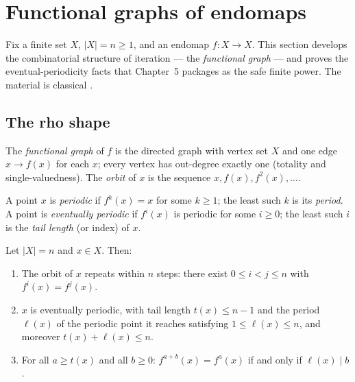 \section{Functional graphs of endomaps}\label{ch02:sec:funcgraphs}

Fix a finite set $X$, $|X| = n \geq 1$, and an endomap $f : X \to X$. This
section develops the combinatorial structure of iteration --- the
\emph{functional graph} --- and proves the eventual-periodicity facts that
Chapter~5 packages as the safe finite power. The material is classical
\cite{pin, howie}.

\subsection{The rho shape}

\begin{definition}\label{ch02:def:funcgraph}
The \emph{functional graph} of $f$ is the directed graph with vertex set
$X$ and one edge $x \to f(x)$ for each $x$; every vertex has out-degree
exactly one (totality and single-valuedness). The \emph{orbit} of $x$ is
the sequence $x, f(x), f^2(x), \dots$.
\end{definition}

\begin{definition}\label{ch02:def:periodic}
A point $x$ is \emph{periodic} if $f^k(x) = x$ for some $k \geq 1$; the
least such $k$ is its \emph{period}. A point is \emph{eventually periodic}
if $f^i(x)$ is periodic for some $i \geq 0$; the least such $i$ is the
\emph{tail length} (or index) of $x$.
\end{definition}

\begin{lemma}\label{ch02:lem:rho}
Let $|X| = n$ and $x \in X$. Then:
\begin{enumerate}
\item The orbit of $x$ repeats within $n$ steps: there exist
$0 \leq i < j \leq n$ with $f^i(x) = f^j(x)$.
\item $x$ is eventually periodic, with tail length $t(x) \leq n - 1$ and
the period $\ell(x)$ of the periodic point it reaches satisfying
$1 \leq \ell(x) \leq n$, and moreover $t(x) + \ell(x) \leq n$.
\item For all $a \geq t(x)$ and all $b \geq 0$:
$f^{a + b}(x) = f^a(x)$ if and only if $\ell(x) \mid b$.
\end{enumerate}
\end{lemma}

